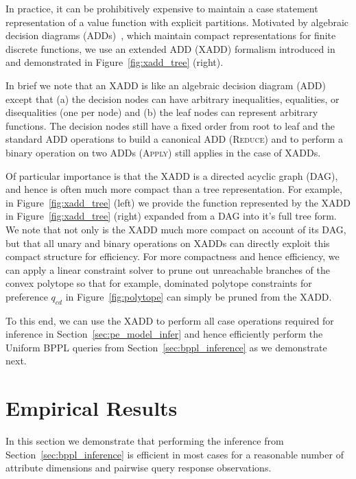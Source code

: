 \documentclass[letterpaper]{article}
\begin{document}
\label{sec:xadd}

In practice, it can be prohibitively expensive to maintain a case
statement representation of a value function with explicit partitions.
Motivated by algebraic decision diagrams (ADDs)~\cite{bahar93add},
which maintain compact representations for finite discrete functions,
we use an extended ADD (XADD) formalism introduced 
in~\cite{uai11} and demonstrated in 
Figure~\ref{fig:xadd_tree} (right).

In brief we note that an XADD is like an algebraic decision 
diagram (ADD)~\cite{bahar93add} except that (a) the decision
nodes can have arbitrary inequalities, equalities, or disequalities (one
per node) and (b) the leaf nodes can represent arbitrary functions.
The decision nodes still have a fixed order from root to leaf
and the standard ADD
operations to build a canonical ADD (\textsc{Reduce}) and 
to perform a binary operation on two ADDs (\textsc{Apply}) 
still applies in the case of XADDs. 

Of particular importance is that the XADD is a directed acyclic graph
(DAG), and hence is often much more compact than a tree
representation.  For example, in Figure~\ref{fig:xadd_tree} (left) we provide
the function represented by the XADD in Figure~\ref{fig:xadd_tree} (right) 
expanded from a DAG into it's full tree form.  We note that not only is
the XADD much more compact on account of its DAG, but that all
unary and binary operations on XADDs can directly exploit this
compact structure for efficiency.  For more compactness and hence efficiency, 
we can apply a linear
constraint solver to prune out unreachable branches of the convex
polytope so that for example, dominated polytope constraints 
for preference $q_{cd}$ in Figure~\ref{fig:polytope} can simply
be pruned from the XADD.

To this end, we can use the XADD to perform all case operations
required for inference in Section~\ref{sec:pe_model_infer} and hence
efficiently perform the Uniform BPPL queries from
Section~\ref{sec:bppl_inference} as we demonstrate next.

\section{Empirical Results}


In this section we demonstrate that performing the inference from
Section~\ref{sec:bppl_inference} is efficient in most cases for
a reasonable number of attribute dimensions and pairwise query
response observations.
\end{document}
